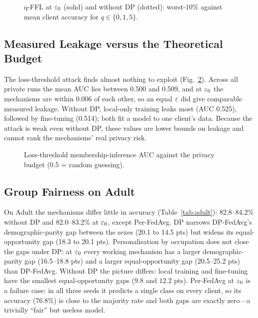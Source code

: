 \begin{figure}[!t]
\centering
{}
\caption{q-FFL at $\eps_0$ (solid) and without DP (dotted): worst-10\% against mean client accuracy for
$q\in\{0,1,5\}$.}
\label{fig:qffl}
\end{figure}

\subsection{Measured Leakage versus the Theoretical Budget}
The loss-threshold attack finds almost nothing to exploit (Fig.~\ref{fig:mia}). Across all private runs the mean
AUC lies between 0.500 and 0.509, and at $\eps_0$ the mechanisms are within 0.006 of each other, so an equal $\varepsilon$
did give comparable measured leakage. Without DP, local-only training leaks most (AUC 0.525), followed by fine-tuning
(0.514); both fit a model to one client's data. Because the attack is weak even without DP, these values are lower
bounds on leakage and cannot rank the mechanisms' real privacy risk.

\begin{figure}[!t]
\centering
{}
\caption{Loss-threshold membership-inference AUC against the privacy budget (0.5 = random guessing).}
\label{fig:mia}
\end{figure}

\subsection{Group Fairness on Adult}
On Adult the mechanisms differ little in accuracy (Table~\ref{tab:adult}): 82.8--84.2\% without DP and 82.0--83.2\%
at $\eps_0$, except Per-FedAvg. DP narrows DP-FedAvg's demographic-parity gap between the sexes (20.1 to 14.5 pts)
but widens its equal-opportunity gap (18.3 to 20.1 pts). Personalisation by occupation does not close the gaps under
DP: at $\eps_0$ every working mechanism has a larger demographic-parity gap (16.5--18.8 pts) and a larger
equal-opportunity gap (20.5--25.2 pts) than DP-FedAvg. Without DP the picture differs: local training and
fine-tuning have the smallest equal-opportunity gaps (9.8 and 12.2 pts). Per-FedAvg at $\eps_0$ is a failure case:
in all three seeds it predicts a single class on every client, so its accuracy (76.8\%) is close to the majority
rate and both gaps are exactly zero---a trivially ``fair'' but useless model.

\begin{table}[!t]
\caption{Adult (clients = occupations): accuracy and group-fairness gaps by sex, without DP and at $\eps_0$
(mean $\pm$ SD over three seeds; gaps in percentage points, lower is fairer).}
\label{tab:adult}
\centering
\footnotesize
{}
\end{table}

